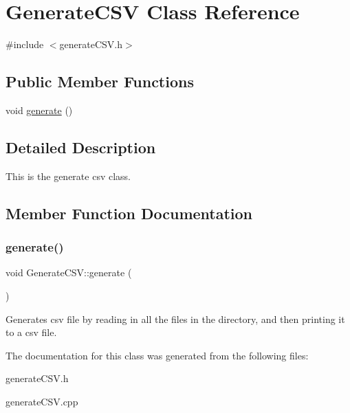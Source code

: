 \hypertarget{classGenerateCSV}{}\section{Generate\+C\+SV Class Reference}
\label{classGenerateCSV}


{\ttfamily \#include $<$generate\+C\+S\+V.\+h$>$}

\subsection*{Public Member Functions}
\begin{DoxyCompactItemize}
\item 
void \hyperlink{classGenerateCSV_a0821f111f630f2dfb617f7a77a23405c}{generate} ()
\end{DoxyCompactItemize}


\subsection{Detailed Description}
This is the generate csv class. 

\subsection{Member Function Documentation}
\mbox{\label{classGenerateCSV_a0821f111f630f2dfb617f7a77a23405c}} 
\subsubsection{\texorpdfstring{generate()}{generate()}}
{\footnotesize\ttfamily void Generate\+C\+S\+V\+::generate (\begin{DoxyParamCaption}{ }\end{DoxyParamCaption})}

Generates csv file by reading in all the files in the directory, and then printing it to a csv file. 

The documentation for this class was generated from the following files\+:\begin{DoxyCompactItemize}
\item 
generate\+C\+S\+V.\+h\item 
generate\+C\+S\+V.\+cpp\end{DoxyCompactItemize}
